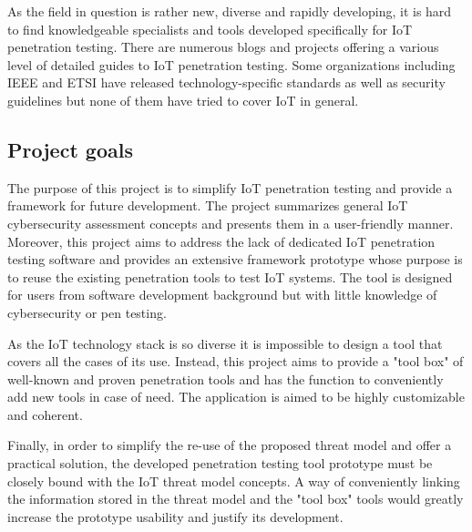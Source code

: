 As the field in question is rather new, diverse and rapidly developing, it is hard to find knowledgeable specialists and tools developed specifically for IoT penetration testing. There are numerous blogs and projects offering a various level of detailed guides to IoT penetration testing\cite{github}. Some organizations including IEEE and ETSI have released technology-specific standards as well as security guidelines but none of them have tried to cover IoT in general\cite{Zhao:2013:SIT:2584913.2585964}. 

\subsection{Project goals}
The purpose of this project is to simplify IoT penetration testing and provide a framework for future development. The project summarizes general IoT cybersecurity assessment concepts and presents them in a user-friendly manner. Moreover, this project aims to address the lack of dedicated IoT penetration testing software and provides an extensive framework prototype whose purpose is to reuse the existing penetration tools to test IoT systems. The tool is designed for users from software development background but with little knowledge of cybersecurity or pen testing. 

As the IoT technology stack is so diverse it is impossible to design a tool that covers all the cases of its use. Instead, this project aims to provide a "tool box" of well-known and proven penetration tools and has the function to conveniently add new tools in case of need. The application is aimed to be highly customizable and coherent.

Finally, in order to simplify the re-use of the proposed threat model and offer a practical solution, the developed penetration testing tool prototype must be closely bound with the IoT threat model concepts. A way of conveniently linking the information stored in the threat model and the "tool box" tools would greatly increase the prototype usability and justify its development.

